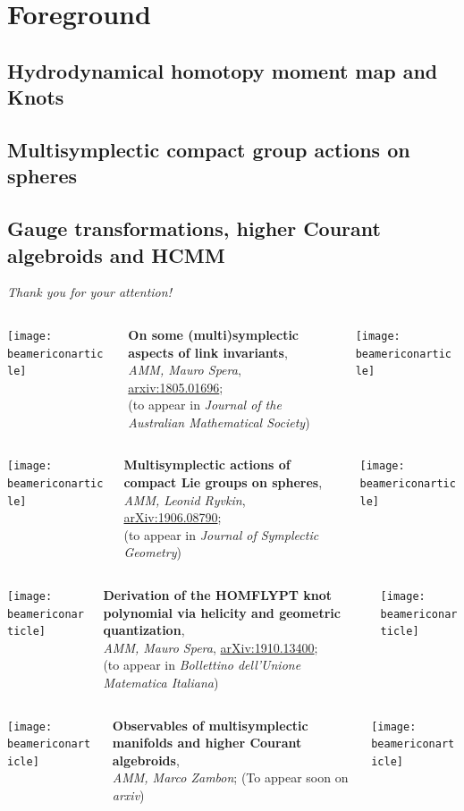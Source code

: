 \documentclass[handout,10pt]{beamer}
\newcommand{\thankyouslide}[0]{
	\ifHandout

	\else
	\addtocounter{framenumber}{-1}
	\begin{frame}{}
	\label{frame:thankyouslide}
		\vfill
	  \centering 
	  {\Huge\color{red} 
	  \emph{Thank you for your attention!}}
		\vfill
		\centering
		\begin{columns}
			\hfill
			\begin{column}{0.05\linewidth}
				\centering \texttt{[image: beamericonarticle]}
			\end{column}
			\begin{column}{0.8\linewidth}
				\centering
				\textbf{On some (multi)symplectic aspects of link invariants},
				\\
				\emph{AMM, Mauro Spera}, \href{https://arXiv.org/abs/1805.01696}{arxiv:1805.01696};\\
				(to appear in \emph{Journal of the Australian Mathematical Society})	
			\end{column}
			\begin{column}{0.05\linewidth}
				\centering \texttt{[image: beamericonarticle]}			
			\end{column}
			\hfill
		\end{columns}
		\vfill
		\begin{columns}
			\hfill
			\begin{column}{0.05\linewidth}
				\centering \texttt{[image: beamericonarticle]}
			\end{column}
			\begin{column}{0.8\linewidth}
				\centering
				\textbf{Multisymplectic actions of compact Lie groups on spheres},
				\\
				\emph{AMM, Leonid Ryvkin}, \href{https://arxiv.org/abs/1906.08790}{arXiv:1906.08790};
				\\
				(to appear in \emph{Journal of Symplectic Geometry})
			\end{column}
			\begin{column}{0.05\linewidth}
				\centering \texttt{[image: beamericonarticle]}			
			\end{column}
			\hfill
		\end{columns}		
		\vfill		
		\begin{columns}
			\hfill
			\begin{column}{0.05\linewidth}
				\centering \texttt{[image: beamericonarticle]}
			\end{column}
			\begin{column}{0.8\linewidth}
				\centering
		\textbf{Derivation of the HOMFLYPT knot polynomial via helicity and geometric quantization},
				\\
		\emph{AMM, Mauro Spera}, \href{https://arxiv.org/abs/1910.13400}{arXiv:1910.13400};\\
				(to appear in \emph{Bollettino dell'Unione Matematica Italiana})	
			\end{column}				
			\begin{column}{0.05\linewidth}
				\centering \texttt{[image: beamericonarticle]}			
			\end{column}
			\hfill
		\end{columns}
		\vfill
		\begin{columns}
			\hfill
			\begin{column}{0.05\linewidth}
				\centering \texttt{[image: beamericonarticle]}
			\end{column}
			\begin{column}{0.8\linewidth}
				\centering
				\textbf{Observables of multisymplectic manifolds and higher Courant algebroids},
				\\
				\emph{AMM, Marco Zambon}; %
				(To appear soon on \emph{arxiv})	
			\end{column}
			\begin{column}{0.05\linewidth}
				\centering \texttt{[image: beamericonarticle]}			
			\end{column}
			\hfill
		\end{columns}
	\end{frame}
	\note[itemize]{
		\item
	}
	\fi
}
\begin{document}
\section{Foreground}

	\subsection{Hydrodynamical homotopy moment map and Knots}
	\subcheckpoint	
	
	\subsection{Multisymplectic compact group actions on spheres}
	\subcheckpoint	
	
	\subsection{Gauge transformations, higher Courant algebroids and HCMM}
	\subcheckpoint	
	


	\thankyouslide


\end{document}
